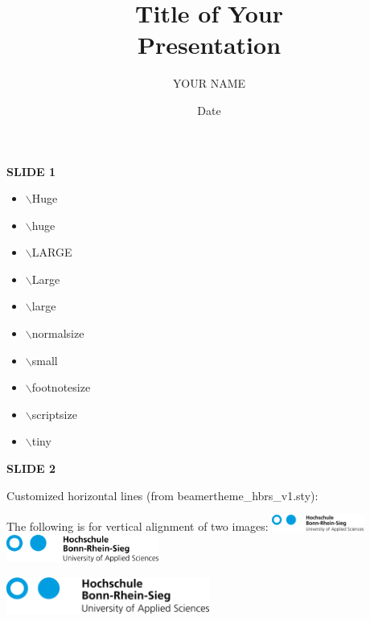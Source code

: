 \documentclass[11pt,vertical]{beamer}
\title{ \textcolor{HBRS}{\Huge\textbf{Title of Your\\ \vspace{1cm} Presentation}} }
\author{YOUR NAME}
\date{Date}
\begin{document}
\frame{\titlepage}

\begin{frame}{\small \textbf{SLIDE 1}}
	
	\begin{itemize}
	    \item \Huge  $\backslash$Huge
	    \item \huge  $\backslash$huge
	    \item \LARGE $\backslash$LARGE
	    \item \Large $\backslash$Large
	    \item \large $\backslash$large
	    \item \normalsize $\backslash$normalsize
	    \item \small $\backslash$small
	    \item \footnotesize $\backslash$footnotesize
	    \item \scriptsize $\backslash$scriptsize
	    \item \tiny $\backslash$tiny
  \end{itemize}

\end{frame}

\begin{frame}{\small \textbf{SLIDE 2}}
	\centering

	Customized horizontal lines (from beamertheme\_hbrs\_v1.sty):
	\lhline
	\mhline
	\shline

	\vfill

	The following is for vertical alignment of two images:
	\lhline
	\includegraphics[valign=m, width=3.0cm]{logo_hbrs}\hspace{1cm}
	\includegraphics[valign=m, width=5.0cm]{logo_hbrs}
	\lhline

	\vfill
	\includegraphics[width=0.5\textwidth]{logo_hbrs}
\end{frame}
\end{document}
